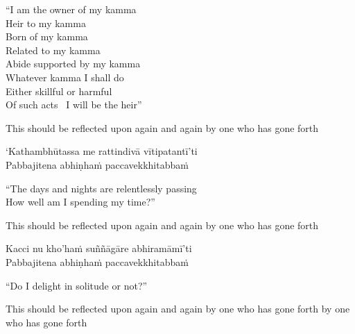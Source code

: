 \begin{english-verses}
  ``I am the owner of my kamma\\
  Heir to my kamma\\
  Born of my kamma\\
  Related to my kamma\\
  Abide supported by my kamma\\
  Whatever kamma I shall do\\
  Either skillful or harmful\\
  Of such acts \breathmark\ I will be the heir''\makeatletter\hyperlink{endnote102-appendix}\makeatother
  \begin{english-hangtogether-verses}
    This should be reflected upon again and again by one who has gone forth
  \end{english-hangtogether-verses}
\end{english-verses}

`Kathambhūtassa me rattindivā vītipatantī'ti\\
Pabbajitena abhiṇhaṁ paccavekkhitabbaṁ

\begin{english-verses}
  ``The days and nights are relentlessly passing\\
  How well am I spending my time?''
  \begin{english-hangtogether-verses}
    This should be reflected upon again and again by one who has gone forth
  \end{english-hangtogether-verses}
\end{english-verses}

Kacci nu kho'haṁ suññāgāre abhiramāmī'ti\\
Pabbajitena abhiṇhaṁ paccavekkhitabbaṁ

\begin{english-verses}
  ``Do I delight in solitude or not?''
  \begin{english-hangtogether-verses}
    This should be reflected upon again and again by one who has gone forth by one who has gone forth
  \end{english-hangtogether-verses}
\end{english-verses}

